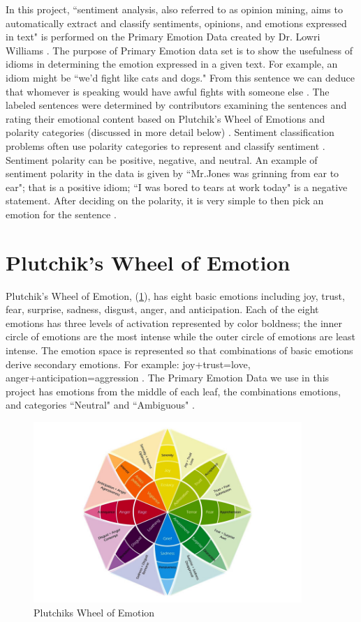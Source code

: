 \documentclass[titlepage,letterpaper]{article}
\begin{document}
In this project, ``sentiment analysis, also referred to as opinion mining, aims to automatically extract and classify sentiments, opinions, and emotions expressed in text" is performed on the Primary Emotion Data created by Dr. Lowri Williams \cite{lowriwilliams}. The purpose of Primary Emotion data set is to show the usefulness of idioms in determining the emotion expressed in a given text. For example, an idiom might be ``we'd fight like cats and dogs." From this sentence we can deduce that whomever is speaking would have awful fights with someone else \cite{lowriwilliams}. The labeled sentences were determined by contributors examining the sentences and rating their emotional content based on Plutchik's Wheel of Emotions and polarity categories (discussed in more detail below) \cite{lowriwilliams}. Sentiment classification problems often use polarity categories to represent and classify sentiment \cite{lowriwilliams}. Sentiment polarity can be positive, negative, and neutral. An example of sentiment polarity in the data is given by ``Mr.Jones was grinning from ear to ear"; that is a positive idiom; ``I was bored to tears at work today" is a negative statement. After deciding on the polarity, it is very simple to then pick an emotion for the sentence \cite{lowriwilliams}. 

\section{Plutchik's Wheel of Emotion}

Plutchik's Wheel of Emotion, (\cref{plutchikemotionwheel}), has eight basic emotions including joy, trust, fear, surprise, sadness, disgust, anger, and anticipation. Each of the eight emotions has three levels of activation represented by color boldness; the inner circle of emotions are the most intense while the outer circle of emotions are least intense. The emotion space is represented so that combinations of basic emotions derive secondary emotions. For example: joy+trust=love, anger+anticipation=aggression \cite{plutchik2001nature}. The Primary Emotion Data we use in this project has emotions from the middle of each leaf, the combinations emotions, and categories ``Neutral" and ``Ambiguous" \cite{lowriwilliams}.

\begin{figure}[ht]
	\centering
	\includegraphics[width=4in]{PlutchikWheelOfEmotion.jpg}
	\caption{Plutchiks Wheel of Emotion \cite{WheelofEmotion}}
	\label{plutchikemotionwheel}
\end{figure}
\end{document}
